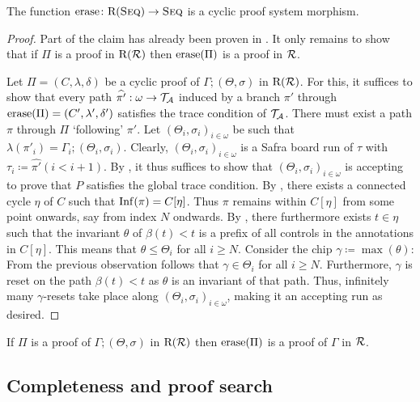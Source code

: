 \begin{theorem}\label{lem:strip-cyclic-morph}
  The function $\mathrm{erase} \colon \mathrm{R}(\textsc{Seq}) \to \textsc{Seq}$ is a cyclic proof system
  morphism.
\end{theorem}
\begin{proof}
  Part of the claim has already been proven in .
  It only remains to show that if $\Pi$ is a proof in $\mathrm{R}(\mathcal{R})$ then
  $\mathrm{erase}(\Pi)$ is a proof in $\mathcal{R}$.
  
  Let $\Pi = (C, \lambda, \delta)$ be a cyclic proof of $\Gamma ; (\Theta,
  \sigma)$ in $\mathrm{R}(\mathcal{R})$. For this, it suffices to show that every path
  $\widehat{\pi'}: \omega \to \mathcal{T}_{\mathcal{A}}$ induced by a branch $\pi'$ through 
  $\mathrm{erase}(\Pi) = (C', \lambda', \delta')$ satisfies the trace condition of $\mathcal{T}_{\mathcal{A}}$.
  There must exist a path
  $\pi$ through $\Pi$
  `following' $\pi'$. Let $(\Theta_i, \sigma_i)_{i \in \omega}$ be such that
  $\lambda(\pi'_i) = \Gamma_i ; (\Theta_i, \sigma_i)$. Clearly, $(\Theta_i, \sigma_i)_{i \in
    \omega}$ is a Safra board run of $\tau$ with $\tau_i \coloneq \widehat{\pi'}(i < i + 1)$. By
  , it thus suffices to show that $(\Theta_i, \sigma_i)_{i
    \in \omega}$ is accepting to prove that $P$ satisfies the global trace
  condition. By , there exists a connected cycle $\eta$ of $C$
  such that $\mathrm{Inf}(\pi) = C[\eta]$. Thus $\pi$ remains within $C[\eta]$ from some
  point onwards, say from index $N$ ondwards. By
  , there furthermore exists $t \in \eta$ such that the invariant
  $\theta$ of $\beta(t) < t$ is a prefix of all controls in the annotations in
  $C[\eta]$. This means that $\theta \leq \Theta_i$ for all $i \geq N$. Consider
  the chip $\gamma \coloneq \max(\theta)$: From the previous observation follows that
  $\gamma \in \Theta_i$ for all $i \geq N$. Furthermore, $\gamma$ is reset on
  the path $\beta(t) < t$ as $\theta$ is an invariant of that path. Thus,
  infinitely many $\gamma$-resets take place along $(\Theta_i, \sigma_i)_{i \in
    \omega}$, making it an accepting run as desired.
\end{proof}

\begin{corollary}[Soundness]\label{lem:sound}
  If $\Pi$ is a proof of $\Gamma ; (\Theta, \sigma)$ in $\mathrm{R}(\mathcal{R})$ then
  $\mathrm{erase}(\Pi)$ is a proof of $\Gamma$ in $\mathcal{R}$.
\end{corollary}

\subsection{Completeness and proof search}
\label{sec:complete}

